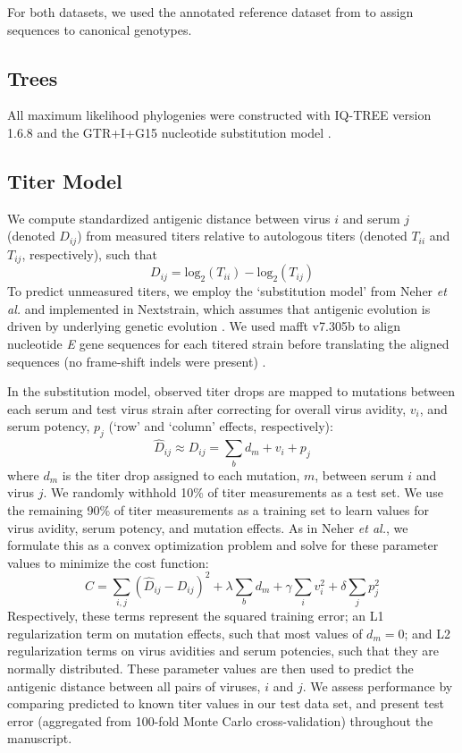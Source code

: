 \documentclass[11pt,oneside,letterpaper]{article}
\begin{document}
For both datasets, we used the annotated reference dataset from \citep{pyke2016highly} to assign sequences to canonical genotypes.

\subsection{Trees}
All maximum likelihood phylogenies were constructed with IQ-TREE version 1.6.8 and the GTR+I+G15 nucleotide substitution model \citep{nguyen2014iq}.

\subsection*{Titer Model}
We compute standardized antigenic distance between virus $i$ and serum $j$ (denoted $D_{ij}$) from measured titers relative to autologous titers (denoted $T_{ii}$ and $T_{ij}$, respectively), such that
\begin{equation}
  \label{eq_titer_norm}
D_{ij} = \mathrm{log}_2(T_{ii}) - \mathrm{log}_2(T_{ij})
\end{equation}
To predict unmeasured titers, we employ the `substitution model' from Neher \textit{et al.} and implemented in Nextstrain, which assumes that antigenic evolution is driven by underlying genetic evolution \citep{hadfield2017nextstrain,neher2016prediction}.
We used mafft v7.305b to align nucleotide \textit{E} gene sequences for each titered strain before translating the aligned sequences (no frame-shift indels were present) \citep{katoh2013mafft}.

In the substitution model, observed titer drops are mapped to mutations between each serum and test virus strain after correcting for overall virus avidity, $v_i$, and serum potency, $p_j$ (`row' and `column' effects, respectively):
\begin{equation}
  \label{eq_predicted_titers}
\hat{D}_{ij} \approx D_{ij} = \sum_{b} d_m + v_i + p_j
\end{equation}
where $d_m$ is the titer drop assigned to each mutation, $m$, between serum $i$ and virus $j$.
We randomly withhold 10\% of titer measurements as a test set.
We use the remaining 90\% of titer measurements as a training set to learn values for virus avidity, serum potency, and mutation effects.
As in Neher \textit{et al.}, we formulate this as a convex optimization problem and solve for these parameter values to minimize the cost function:
\begin{equation}
  \label{eq_cost_fn}
C = \sum_{i,j} (\hat{D}_{ij} - D_{ij})^2 + \lambda \sum_{b} d_m + \gamma \sum_{i} v_i^2 + \delta \sum_{j} p_j^2
\end{equation}
Respectively, these terms represent the squared training error; an L1 regularization term on mutation effects, such that most values of $d_m = 0$; and L2 regularization terms on virus avidities and serum potencies, such that they are normally distributed.
These parameter values are then used to predict the antigenic distance between all pairs of viruses, $i$ and $j$.
We assess performance by comparing predicted to known titer values in our test data set, and present test error (aggregated from 100-fold Monte Carlo cross-validation) throughout the manuscript.
\end{document}
